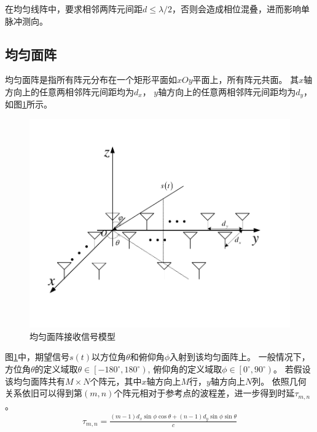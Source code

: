\documentclass[master]{thesis-uestc}
\begin{document}
在均匀线阵中，要求相邻两阵元间距$d\leq\lambda/2$，否则会造成相位混叠，进而影响单脉冲测向。

\subsection{均匀面阵}
均匀面阵是指所有阵元分布在一个矩形平面如$xOy$平面上，所有阵元共面。
其$x$轴方向上的任意两相邻阵元间距均为$d_x$，
$y$轴方向上的任意两相邻阵元间距均为$d_y$，如图\ref{URA}所示。
\begin{figure}[h]
\includegraphics[scale=0.8]{pic/URA.pdf}
\caption{均匀面阵接收信号模型}
\label{URA}
\end{figure}

图\ref{URA}中，期望信号$s(t)$以方位角$\theta$和俯仰角$\phi$入射到该均匀面阵上。
一般情况下，方位角$\theta$的定义域取$\theta\in\left[-180^\circ,180^\circ\right)$,
俯仰角的定义域取$\phi\in\left[0^\circ,90^\circ\right)$。
若假设该均匀面阵共有$M \times N$个阵元，其中$x$轴方向上$M$行，$y$轴方向上$N$列。
依照几何关系依旧可以得到第$(m,n)$个阵元相对于参考点的波程差，进一步得到时延$\tau_{m,n}$。
\begin{equation}\label{URA_time_delay}
    \begin{aligned}
        \tau_{m,n} = 
        \frac{(m-1)d_x\sin\phi\cos\theta + (n-1)d_y\sin\phi\sin\theta}{c}
    \end{aligned}
\end{equation}
\end{document}
